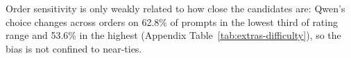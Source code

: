 Order sensitivity is only weakly related to how close the candidates are: Qwen's choice changes across orders on 62.8\% of prompts in the lowest third of rating range and 53.6\% in the highest (Appendix Table~\ref{tab:extras-difficulty}), so the bias is not confined to near-ties.
